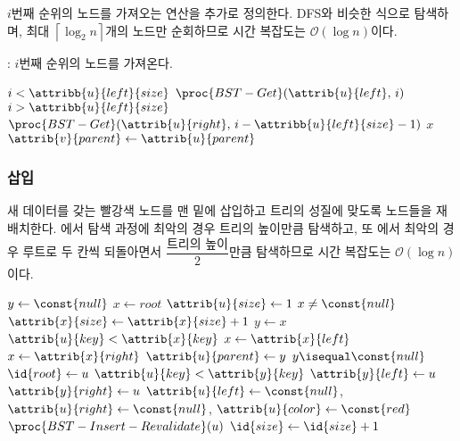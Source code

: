$i$번째 순위의 노드를 가져오는 연산을 추가로 정의한다. DFS와 비슷한 식으로 탐색하며, 최대 $\left\lceil\log_2 n\right\rceil$개의 노드만 순회하므로
시간 복잡도는 $\mathcal{O}\left(\log n\right)$이다.

: $i$번째 순위의 노드를 가져온다.

\begin{codebox}
\li \If $i < \attribb{u}{left}{size}$ \Then
\li     \Return $\proc{BST-Get}(\attrib{u}{left},\,i)$
\li \ElseIf $i > \attribb{u}{left}{size}$ \Then
\li     \Return $\proc{BST-Get}(\attrib{u}{right},\,i-\attribb{u}{left}{size}-1)$
\li \ElseNoIf
\li     \Return $x$
    \End
\li $\attrib{v}{parent} \gets \attrib{u}{parent}$
\end{codebox}

\newpage

\subsubsection{삽입} 새 데이터를 갖는 빨강색 노드를 맨 밑에 삽입하고 트리의 성질에 맞도록 노드들을 재배치한다.
에서 탐색 과정에 최악의 경우 트리의 높이만큼 탐색하고, 또 에서 최악의 경우
루트로 두 칸씩 되돌아면서 $\dfrac{\mbox{트리의 높이}}{2}$만큼 탐색하므로 시간 복잡도는 $\mathcal{O}\left(\log n\right)$이다.

\begin{codebox}
\li $y \gets \const{null}$
\li $x \gets root$
\li $\attrib{u}{size} \gets 1$
\li \While $x \neq \const{null}$ \Do
\li     $\attrib{x}{size} \gets \attrib{x}{size} + 1$
\li     $y \gets x$
\li     \If $\attrib{u}{key} < \attrib{x}{key}$ \Then
\li         $x \gets \attrib{x}{left}$
\li     \ElseNoIf
\li         $x \gets \attrib{x}{right}$
        \End
    \End
\li $\attrib{u}{parent} \gets y$
\li \If $y \isequal \const{null}$ \Then
\li     $\id{root} \gets u$
\li \ElseIf $\attrib{u}{key} < \attrib{y}{key}$ \Then
\li     $\attrib{y}{left} \gets u$
\li \ElseNoIf
\li     $\attrib{y}{right} \gets u$
    \End
\li $\attrib{u}{left} \gets \const{null}$, $\attrib{u}{right} \gets \const{null}$, $\attrib{u}{color} \gets \const{red}$ 
\li $\proc{BST-Insert-Revalidate}(u)$
\li $\id{size} \gets \id{size} + 1$
\end{codebox}

\newpage
    
